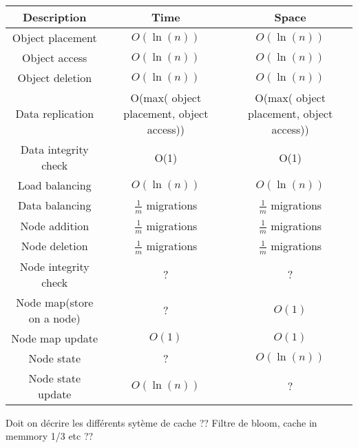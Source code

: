 \begin{table}[h]
  \centering
  \begin{tabular}{|c|c|c|}
  \hline
  Description & Time & Space\\
  \hline
  Object placement & $O(\ln(n))$ &  $O(\ln(n))$ \\
  Object access & $O(\ln(n))$ &  $O(\ln(n))$ \\
  Object deletion & $O(\ln(n))$ & $O(\ln(n))$\\
  Data replication & O(max( object placement, object access)) & O(max( object placement, object access))\\
  Data integrity check & O(1) & O(1) \\
  Load balancing & $O(\ln(n))$ &  $O(\ln(n))$ \\
  Data balancing & $\frac{1}{m}$ migrations & $\frac{1}{m}$ migrations\\ %
  Node addition & $\frac{1}{m}$ migrations & $\frac{1}{m}$ migrations\\
  Node deletion & $\frac{1}{m}$ migrations & $\frac{1}{m}$ migrations\\
  Node integrity check & ? & ? \\ %
  Node map(store on a node) & ? & $O(1)$ \\
  Node map update & $O(1)$ & $O(1)$ \\
  Node state & ? & $O(\ln(n))$ \\
  Node state update & $O(\ln(n))$ & ? \\
  \hline
  \end{tabular}
  \caption{}
\end{table}
Doit on décrire les différents sytème de cache ?? Filtre de bloom, cache in memmory 1/3 etc ??

